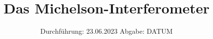 

\subject{V401}
\title{Das Michelson-Interferometer}
\date{%
  Durchführung: 23.06.2023
  \hspace{3em}
  Abgabe: DATUM
}



\maketitle
\thispagestyle{empty}
\tableofcontents
\newpage







\printbibliography{}


